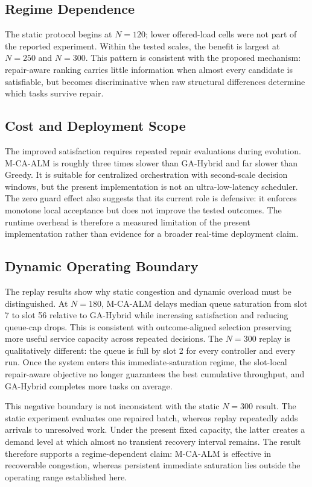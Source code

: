 \documentclass[pdflatex,sn-mathphys-num]{sn-jnl}
\begin{document}
\subsection{Regime Dependence}
The static protocol begins at $N=120$; lower offered-load cells were not
part of the reported experiment. Within the tested scales, the benefit is largest at $N=250$ and 
$N=300$. This pattern is consistent with the proposed mechanism: 
repair-aware ranking carries little information when almost every candidate 
is satisfiable, but becomes discriminative when raw structural differences 
determine which tasks survive repair.

\subsection{Cost and Deployment Scope}
The improved satisfaction requires repeated repair evaluations during evolution. M-CA-ALM is roughly three times slower than GA-Hybrid and far slower than Greedy. It is suitable for centralized orchestration with second-scale decision windows, but the present implementation is not an ultra-low-latency scheduler. The zero guard effect also suggests that its current role is defensive: it enforces monotone local acceptance but does not improve the tested outcomes. The runtime overhead is therefore a measured limitation of the present implementation rather than evidence for a broader real-time deployment claim.

\subsection{Dynamic Operating Boundary}
The replay results show why static congestion and dynamic overload must be distinguished. At $N=180$, M-CA-ALM delays median queue saturation from slot 7 to slot 56 relative to GA-Hybrid while increasing satisfaction and reducing queue-cap drops. This is consistent with outcome-aligned selection preserving more useful service capacity across repeated decisions. The $N=300$ replay is qualitatively different: the queue is full by slot 2 for every controller and every run. Once the system enters this immediate-saturation regime, the slot-local repair-aware objective no longer guarantees the best cumulative throughput, and GA-Hybrid completes more tasks on average.

This negative boundary is not inconsistent with the static $N=300$ result. The static experiment evaluates one repaired batch, whereas replay repeatedly adds arrivals to unresolved work. Under the present fixed capacity, the latter creates a demand level at which almost no transient recovery interval remains. The result therefore supports a regime-dependent claim: M-CA-ALM is effective in recoverable congestion, whereas persistent immediate saturation lies outside the operating range established here.
\end{document}
